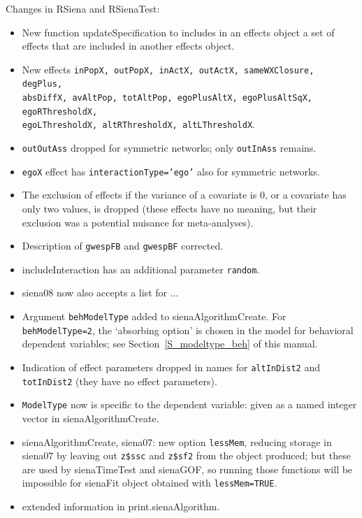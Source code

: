 \documentclass[a4paper,fleqn,11pt]{article}
\newcommand{\+}{\, + \,}
\newcommand{\sfn}[1]{\textsf{#1}}
\begin{document}
\begin{small}
\begin{itemize}
Changes in RSiena and RSienaTest:
\begin{itemize}
   \item New function \sfn{updateSpecification} to includes in an
   effects object a set of effects that are included in another effects object.
   \item New effects \texttt{inPopX, outPopX, inActX, outActX, sameWXClosure, degPlus,\\
     absDiffX, avAltPop, totAltPop, egoPlusAltX, egoPlusAltSqX,
     egoRThresholdX, \\ egoLThresholdX, altRThresholdX, altLThresholdX}.
   \item \texttt{outOutAss} dropped for symmetric networks;
   only \texttt{outInAss} remains.
   \item \texttt{egoX} effect has \texttt{interactionType='ego'}
   also for symmetric networks.
   \item The exclusion of effects if the variance of a covariate is 0,
     or a covariate has only two values, is dropped (these effects have no meaning,
     but their exclusion was a potential nuisance for meta-analyses).
   \item Description of \texttt{gwespFB} and \texttt{gwespBF} corrected.
   \item \sfn{includeInteraction} has an additional parameter \texttt{random}.
   \item \sfn{siena08} now also accepts a list for ...
   \item Argument \texttt{behModelType} added to \sfn{sienaAlgorithmCreate}.
       For \texttt{behModelType=2}, the `absorbing option' is chosen
     in the model for behavioral dependent variables;
     see Section~\ref{S_modeltype_beh} of this manual.
   \item Indication of effect parameters dropped in names for
     \texttt{altInDist2} and \texttt{totInDist2} (they have no effect parameters).
   \item \texttt{ModelType} now is specific to the dependent variable:
     given as a named integer vector in \sfn{sienaAlgorithmCreate}.
   \item \sfn{sienaAlgorithmCreate, siena07}: new option \texttt{lessMem},
      reducing storage in \sfn{siena07} by leaving out
      \texttt{z\$ssc} and \texttt{z\$sf2} from the object produced;
      but these are used by
     \sfn{sienaTimeTest} and \sfn{sienaGOF}, so running those functions will be impossible
     for \sfn{sienaFit} object obtained with \texttt{lessMem=TRUE}.
   \item extended information in \sfn{print.sienaAlgorithm}.

\end{itemize}
\end{itemize}
\end{small}
\end{document}
